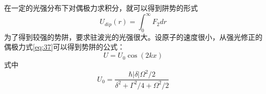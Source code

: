 \documentclass{article}
\begin{document}
	在一定的光强分布下对偶极力求积分，就可以得到阱势的形式
	\begin{equation}
		U_{dip}(r) = \int_0^{\infty} F_2 dr
	\end{equation}
	为了得到较强的势阱，要求驻波光的光强很大。设原子的速度很小，从强光修正的偶极力式\ref{eq:37}可以得到势阱的公式：
	\begin{equation}
		U = U_0 \cos(2kx)
	\end{equation}
	式中
	\begin{equation}
		U_0 = \frac{\hbar |\delta| \Omega^2/2}{\delta^2 + \Gamma^2/4 + \Omega^2/2}
	\end{equation}
	
\end{document}
